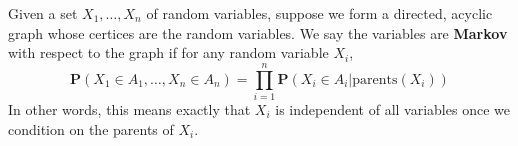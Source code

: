 Given a set $X_1, \dots, X_n$ of random variables, suppose we form a directed, acyclic graph whose certices are the random variables. We say the variables are {\bf Markov} with respect to the graph if for any random variable $X_i$,
%
\[ \mathbf{P}(X_1 \in A_1, \dots, X_n \in A_n) = \prod_{i = 1}^n \mathbf{P}(X_i \in A_i | \text{parents}(X_i)) \]
%
In other words, this means exactly that $X_i$ is independent of all variables once we condition on the parents of $X_i$.

